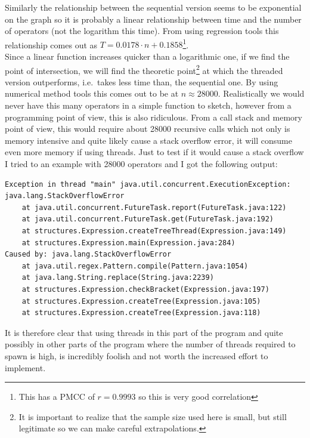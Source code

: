 \documentclass[../../../../../main.tex]{subfiles}
\begin{document}
Similarly the relationship between the sequential version seems to be exponential on the graph so it is probably a linear relationship between time and the number of operators (not the logarithm this time). From using regression tools this relationship comes out as $T = 0.0178\cdot n + 0.1858$\footnote{This has a PMCC of $r=0.9993$ so this is very good correlation}.\\
Since a linear function increases quicker than a logarithmic one, if we find the point of intersection, we will find the theoretic point\footnote{It is important to realize that the sample size used here is small, but still legitimate so we can make careful extrapolations.} at which the threaded version outperforms, i.e.\ takes less time than, the sequential one. By using numerical method tools this comes out to be at $n\approx 28000$. Realistically we would never have this many operators in a simple function to sketch, however from a programming point of view, this is also ridiculous. From a call stack and memory point of view, this would require about 28000 recursive calls which not only is memory intensive and quite likely cause a stack overflow error\cite{recursionCallsJava}, it will consume even more memory if using threads. Just to test if it would cause a stack overflow I tried to an example with 28000 operators and I got the following output:
\begin{verbatim}
Exception in thread "main" java.util.concurrent.ExecutionException: java.lang.StackOverflowError
	at java.util.concurrent.FutureTask.report(FutureTask.java:122)
	at java.util.concurrent.FutureTask.get(FutureTask.java:192)
	at structures.Expression.createTreeThread(Expression.java:149)
	at structures.Expression.main(Expression.java:284)
Caused by: java.lang.StackOverflowError
	at java.util.regex.Pattern.compile(Pattern.java:1054)
	at java.lang.String.replace(String.java:2239)
	at structures.Expression.checkBracket(Expression.java:197)
	at structures.Expression.createTree(Expression.java:105)
	at structures.Expression.createTree(Expression.java:118)
\end{verbatim}
It is therefore clear that using threads in this part of the program and quite possibly in other parts of the program where the number of threads required to spawn is high, is incredibly foolish and not worth the increased effort to implement.\\

\newpage
\end{document}
